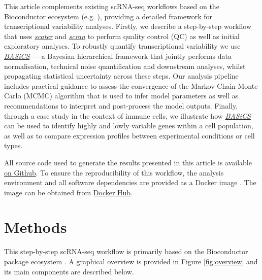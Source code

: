 \documentclass[9pt,a4paper,]{extarticle}
\begin{document}
This article complements existing scRNA-seq workflows based on the Bioconductor
ecosystem (e.g. \citep{Lun2016, Kim2019}), providing a detailed framework for
transcriptional variability analyses.
Firstly, we describe a step-by-step workflow that uses
\emph{\href{https://bioconductor.org/packages/3.11/scater}{scater}} \citep{McCarthy2017} and \emph{\href{https://bioconductor.org/packages/3.11/scran}{scran}} \citep{Lun2016}
to perform quality control (QC) as well as initial exploratory analyses.
To robustly quantify transcriptional variability we use \emph{\href{https://bioconductor.org/packages/3.11/BASiCS}{BASiCS}}
\citep{Vallejos2015, Vallejos2016, Eling2017} --- a Bayesian hierarchical framework
that jointly performs data normalisation, technical noise quantification and
downstream analyses, whilst propagating statistical uncertainty across these
steps.
Our analysis pipeline includes practical guidance to assess the convergence of
the Markov Chain Monte Carlo (MCMC) algorithm that is used to infer model
parameters as well as recommendations to interpret and post-process the model
outputs.
Finally, through a case study in the context of immune cells, we illustrate
how \emph{\href{https://bioconductor.org/packages/3.11/BASiCS}{BASiCS}} can be used to identify highly and lowly variable
genes within a cell population, as well as to compare expression profiles
between experimental conditions or cell types.

All source code used to generate the results presented in this article is
available \href{https://github.com/VallejosGroup/BASiCSWorkflow}{on Github}.
To ensure the
reproducibility of this workflow, the analysis environment and all software
dependencies are provided as a Docker image \citep{Boettiger2015}. The image
can be obtained from
\href{https://hub.docker.com/repository/docker/alanocallaghan/bocker}{Docker Hub}.

\hypertarget{methods}{%
\section{Methods}\label{methods}}

This step-by-step scRNA-seq workflow is primarily based on the Bioconductor
package ecosystem \citep{Amezquita2019}.
A graphical overview is provided in Figure \ref{fig:overview}
and its main components are described below.
\end{document}

